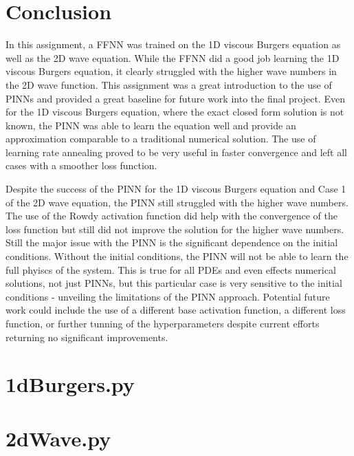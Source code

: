 \documentclass[11pt]{article}
\begin{document}
\section{Conclusion}
In this assignment, a FFNN was trained on the 1D viscous Burgers equation as well as the 2D wave equation. While the FFNN did a good job learning the 1D viscous Burgers equation, it clearly struggled with the higher wave numbers in the 2D wave function. This assignment was a great introduction to the use of PINNs and provided a great baseline for future work into the final project. Even for the 1D viscous Burgers equation, where the exact closed form solution is not known, the PINN was able to learn the equation well and provide an approximation comparable to a traditional numerical solution. The use of learning rate annealing proved to be very useful in faster convergence and left all cases with a smoother loss function.

Despite the success of the PINN for the 1D viscous Burgers equation and Case 1 of the 2D wave equation, the PINN still struggled with the higher wave numbers. The use of the Rowdy activation function did help with the convergence of the loss function but still did not improve the solution for the higher wave numbers. Still the major issue with the PINN is the significant dependence on the initial conditions. Without the initial conditions, the PINN will not be able to learn the full phyiscs of the system. This is true for all PDEs and even effects numerical solutions, not just PINNs, but this particular case is very sensitive to the initial conditions - unveiling the limitations of the PINN approach. Potential future work could include the use of a different base activation function, a different loss function, or further tunning of the hyperparameters despite current efforts returning no significant improvements.

\newpage
\section{1dBurgers.py}


\newpage
\section{2dWave.py}

\end{document}
